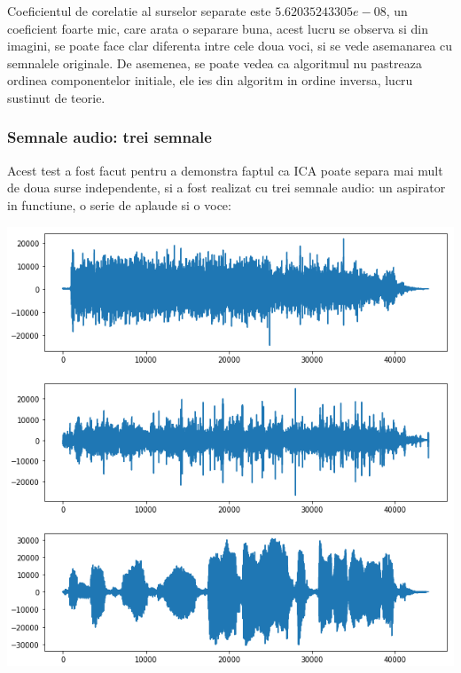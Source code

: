 \documentclass[12pt,oneside]{article}
\begin{document}
 Coeficientul de corelatie al surselor separate este $5.62035243305e-08$, un coeficient foarte mic, care arata o separare buna, acest lucru se observa si din imagini, se poate face clar diferenta intre cele doua voci, si se vede asemanarea cu semnalele originale. De asemenea, se poate vedea ca algoritmul nu pastreaza ordinea componentelor initiale, ele ies din algoritm in ordine inversa, lucru sustinut de teorie.

 \subsubsection{Semnale audio: trei semnale}
 Acest test a fost facut pentru a demonstra faptul ca ICA poate separa mai mult de doua surse independente, si a fost realizat cu trei semnale audio: un aspirator in functiune, o serie de aplaude si o voce:
\begin{center}
	\includegraphics[scale=1]{three_initial}
 \end{center}
\end{document}
